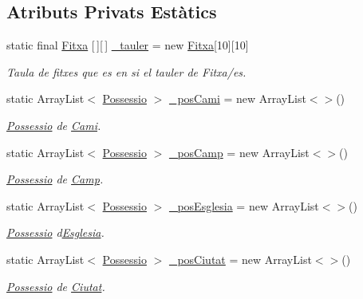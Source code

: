 \subsection*{Atributs Privats Estàtics}
\begin{DoxyCompactItemize}
\item 
static final \mbox{\hyperlink{class_fitxa}{Fitxa}} \mbox{[}$\,$\mbox{]}\mbox{[}$\,$\mbox{]} \mbox{\hyperlink{class_tauler_a3972f60c667bd7f84968b078795bf3cb}{\+\_\+tauler}} = new \mbox{\hyperlink{class_fitxa}{Fitxa}}\mbox{[}10\mbox{]}\mbox{[}10\mbox{]}
\begin{DoxyCompactList}\small\item\em Taula de fitxes que es en si el tauler de Fitxa/es. \end{DoxyCompactList}\item 
static Array\+List$<$ \mbox{\hyperlink{class_possessio}{Possessio}} $>$ \mbox{\hyperlink{class_tauler_acec61a0661595f4b04a2ea653573b830}{\+\_\+pos\+Cami}} = new Array\+List$<$$>$()
\begin{DoxyCompactList}\small\item\em \mbox{\hyperlink{class_possessio}{Possessio}} de \mbox{\hyperlink{class_cami}{Cami}}. \end{DoxyCompactList}\item 
static Array\+List$<$ \mbox{\hyperlink{class_possessio}{Possessio}} $>$ \mbox{\hyperlink{class_tauler_aabba1a73c429cd83aede59f3f5a19b96}{\+\_\+pos\+Camp}} = new Array\+List$<$$>$()
\begin{DoxyCompactList}\small\item\em \mbox{\hyperlink{class_possessio}{Possessio}} de \mbox{\hyperlink{class_camp}{Camp}}. \end{DoxyCompactList}\item 
static Array\+List$<$ \mbox{\hyperlink{class_possessio}{Possessio}} $>$ \mbox{\hyperlink{class_tauler_ad72c3f886d285bbd4c73afa2e4e4bd46}{\+\_\+pos\+Esglesia}} = new Array\+List$<$$>$()
\begin{DoxyCompactList}\small\item\em \mbox{\hyperlink{class_possessio}{Possessio}} d\textquotesingle{}\mbox{\hyperlink{class_esglesia}{Esglesia}}. \end{DoxyCompactList}\item 
static Array\+List$<$ \mbox{\hyperlink{class_possessio}{Possessio}} $>$ \mbox{\hyperlink{class_tauler_ac1c8bd3eed1b45e5c839697b5a64a169}{\+\_\+pos\+Ciutat}} = new Array\+List$<$$>$()
\begin{DoxyCompactList}\small\item\em \mbox{\hyperlink{class_possessio}{Possessio}} de \mbox{\hyperlink{class_ciutat}{Ciutat}}. \end{DoxyCompactList}\end{DoxyCompactItemize}


